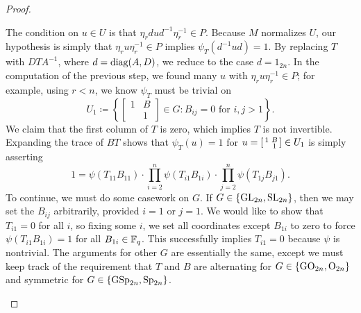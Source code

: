 \begin{proof}
\begin{enumerate}
		The condition on $u\in U$ is that $\eta_rdud^{-1}\eta_r^{-1}\in P$. Because $M$ normalizes $U$, our hypothesis is simply that $\eta_ru\eta_r^{-1}\in P$ implies $\psi_T\left(d^{-1}ud\right)=1$. By replacing $T$ with $DTA^{-1}$, where $d = \operatorname{diag}(A,D)$, we reduce to the case $d=1_{2n}$. In the computation of the previous step, we found many $u$ with $\eta_ru\eta_r^{-1}\in P$; for example, using $r<n$, we know $\psi_T$ must be trivial on
		\[U_1\coloneqq\left\{\begin{bmatrix}
			1 & B \\ & 1
		\end{bmatrix}\in G:B_{ij}=0\text{ for }i,j>1\right\}.\]
		We claim that the first column of $T$ is zero, which
        implies $T$ is not invertible. Expanding the trace of $BT$ shows that $\psi_T(u)=1$ for $u = \begin{bsmallmatrix}
            1 & B \\ & 1
        \end{bsmallmatrix}\in U_1$ is simply asserting
        \[1=\psi(T_{11}B_{11})\cdot \prod_{i=2}^n\psi(T_{i1}B_{1i})\cdot \prod_{j=2}^n\psi(T_{1j}B_{j1}).\]
		To continue, we must do some casework on $G$. If $G\in\{\mathrm{GL}_{2n},\mathrm{SL}_{2n}\}$, then we may set the $B_{ij}$ arbitrarily, provided $i=1$ or $j=1$. We would like to show that $T_{i1}=0$ for all $i$, so fixing some $i$, we set all coordinates except $B_{1i}$ to zero to force $\psi(T_{i1}B_{1i})=1$ for all $B_{1i}\in\mathbb F_q$. This successfully implies $T_{i1}=0$ because $\psi$ is nontrivial. The arguments for other $G$ are essentially the same, except we must keep track of the requirement that $T$ and $B$ are alternating for $G\in\{\mathrm{GO}_{2n},\mathrm{O}_{2n}\}$ and symmetric for $G\in\{\mathrm{GSp}_{2n},\mathrm{Sp}_{2n}\}$.

\end{enumerate}
\end{proof}
